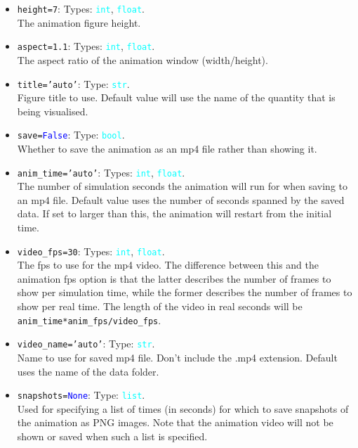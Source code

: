 \documentclass{article}
\newcommand{\ttt}[1]{\texttt{#1}}
\newcommand{\ptype}[1]{\texttt{\textcolor{cyan}{#1}}}
\newcommand{\cbl}[1]{\textcolor{blue}{#1}}
\newcommand{\cro}[1]{\textcolor{RedOrange}{#1}}
\newcommand{\cyo}[1]{\textcolor{YellowOrange}{#1}}
\begin{document}
\begin{itemize}
	\item \ttt{\cro{height}=7}: Types: \ptype{int}, \ptype{float}.\\The animation figure height.
	\item \ttt{\cro{aspect}=1.1}: Types: \ptype{int}, \ptype{float}.\\The aspect ratio of the animation window (width/height).
	\item \ttt{\cro{title}=\cyo{'auto'}}: Type: \ptype{str}.\\Figure title to use. Default value will use the name of the quantity that is being visualised.
	\item \ttt{\cro{save}=\cbl{False}}: Type: \ptype{bool}.\\Whether to save the animation as an mp4 file rather than showing it.
	\item \ttt{\cro{anim\_time}=\cyo{'auto'}}: Types: \ptype{int}, \ptype{float}.\\The number of simulation seconds the animation will run for when saving to an mp4 file. Default value uses the number of seconds spanned by the saved data. If set to larger than this, the animation will restart from the initial time.
	\item \ttt{\cro{video\_fps}=30}: Types: \ptype{int}, \ptype{float}.\\The fps to use for the mp4 video. The difference between this and the animation fps option is that the latter describes the number of frames to show per simulation time, while the former describes the number of frames to show per real time. The length of the video in real seconds will be \ttt{anim\_time*anim\_fps/video\_fps}.
	\item \ttt{\cro{video\_name}=\cyo{'auto'}}: Type: \ptype{str}.\\Name to use for saved mp4 file. Don't include the .mp4 extension. Default uses the name of the data folder.
	\item \ttt{\cro{snapshots}=\cbl{None}}: Type: \ptype{list}.\\Used for specifying a list of times (in seconds) for which to save snapshots of the animation as PNG images. Note that the animation video will not be shown or saved when such a list is specified.
\end{itemize}
\end{document}
